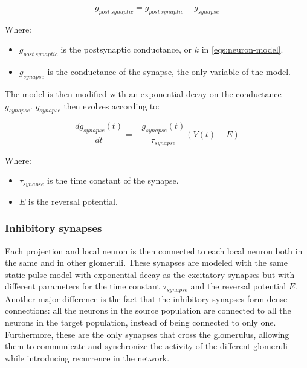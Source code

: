     \begin{equation}
      g_{post\ synaptic} = g_{post\ synaptic} + g_{synapse}
      \label{eqs:static-pulse}
    \end{equation}

    Where:

    \begin{multicols}{2}
      \begin{itemize}
        \item $g_{post\ synaptic}$ is the postsynaptic conductance, or $k$ in \ref{eqs:neuron-model}.
        \item $g_{synapse}$ is the conductance of the synapse, the only variable of the model.
      \end{itemize}
    \end{multicols}

    The model is then modified with an exponential decay on the conductance $g_{synapse}$.
    $g_{synapse}$ then evolves according to:

    \begin{equation}
      \frac{dg_{synapse}(t)}{dt} = -\frac{g_{synapse}(t)}{\tau_{synapse}}(V(t) - E)
      \label{eqs:exponential-decay}
    \end{equation}

    Where:

    \begin{multicols}{2}
      \begin{itemize}
        \item $\tau_{synapse}$ is the time constant of the synapse.
        \item $E$ is the reversal potential.
      \end{itemize}
    \end{multicols}


    \subsubsection{Inhibitory synapses}
    Each projection and local neuron is then connected to each local neuron both in the same and in other glomeruli.
    These synapses are modeled with the same static pulse model with exponential decay as the excitatory synapses but with different parameters for the time constant $\tau_{synapse}$ and the reversal potential $E$.\\
    Another major difference is the fact that the inhibitory synapses form dense connections: all the neurons in the source population are connected to all the neurons in the target population, instead of being connected to only one.
    Furthermore, these are the only synapses that cross the glomerulus, allowing them to communicate and synchronize the activity of the different glomeruli while introducing recurrence in the network.


